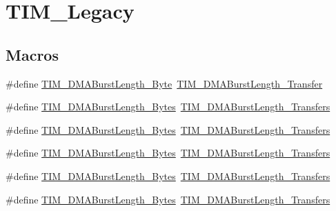 \hypertarget{group___t_i_m___legacy}{}\section{T\+I\+M\+\_\+\+Legacy}
\label{group___t_i_m___legacy}
\subsection*{Macros}
\begin{DoxyCompactItemize}
\item 
\#define \mbox{\hyperlink{group___t_i_m___legacy_gad915c67fae262b887f4f074809448309}{T\+I\+M\+\_\+\+D\+M\+A\+Burst\+Length\+\_\+Byte}}~\mbox{\hyperlink{group___t_i_m___d_m_a___burst___length_gab87f91f1c5583b9888cb6bb37fc639e2}{T\+I\+M\+\_\+\+D\+M\+A\+Burst\+Length\+\_\+Transfer}}
\item 
\#define \mbox{\hyperlink{group___t_i_m___legacy_gabed2d89b663148923f4a7ca63d62d947}{T\+I\+M\+\_\+\+D\+M\+A\+Burst\+Length\+\_\+Bytes}}~\mbox{\hyperlink{group___t_i_m___d_m_a___burst___length_ga829504c3e8c90a9445f6a223bc3034f8}{T\+I\+M\+\_\+\+D\+M\+A\+Burst\+Length\+\_\+Transfers}}
\item 
\#define \mbox{\hyperlink{group___t_i_m___legacy_gad06dbc68a994da99b017a18a7197c0ad}{T\+I\+M\+\_\+\+D\+M\+A\+Burst\+Length\+\_\+Bytes}}~\mbox{\hyperlink{group___t_i_m___d_m_a___burst___length_ga3a99863a0925e0cc9a11b91aade66f11}{T\+I\+M\+\_\+\+D\+M\+A\+Burst\+Length\+\_\+Transfers}}
\item 
\#define \mbox{\hyperlink{group___t_i_m___legacy_ga620ce560a1d7a6d6769cacd2a2ead48d}{T\+I\+M\+\_\+\+D\+M\+A\+Burst\+Length\+\_\+Bytes}}~\mbox{\hyperlink{group___t_i_m___d_m_a___burst___length_ga84bfeb309593a1ac580e233bf7514b36}{T\+I\+M\+\_\+\+D\+M\+A\+Burst\+Length\+\_\+Transfers}}
\item 
\#define \mbox{\hyperlink{group___t_i_m___legacy_gaf9ac4a4cfd3dcfb7ba859898e702c881}{T\+I\+M\+\_\+\+D\+M\+A\+Burst\+Length\+\_\+Bytes}}~\mbox{\hyperlink{group___t_i_m___d_m_a___burst___length_ga44f8aa51fbe8887a5f3c37a0e776902c}{T\+I\+M\+\_\+\+D\+M\+A\+Burst\+Length\+\_\+Transfers}}
\item 
\#define \mbox{\hyperlink{group___t_i_m___legacy_ga7a9cc659b4fc010a31815254f6b57e3f}{T\+I\+M\+\_\+\+D\+M\+A\+Burst\+Length\+\_\+Bytes}}~\mbox{\hyperlink{group___t_i_m___d_m_a___burst___length_ga8be40a21654eea72e9c1bf9922675b22}{T\+I\+M\+\_\+\+D\+M\+A\+Burst\+Length\+\_\+Transfers}}
\item 

\end{DoxyCompactItemize}
